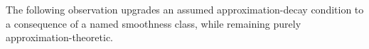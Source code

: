 
The following observation upgrades an assumed approximation-decay condition to
a consequence of a named smoothness class, while remaining purely
approximation-theoretic.

